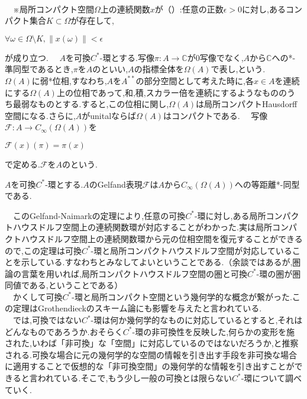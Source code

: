 \\
　※局所コンパクト空間$\Omega$上の連続関数$x$が（）:任意の正数$\epsilon >0$に対し,あるコンパクト集合$K\subset \Omega$が存在して,
\begin{center}
$\forall \omega \in \Omega\setminus K,\parallel x\left( \omega\right)\parallel<\epsilon$
\end{center}
が成り立つ.
　$A$を可換$C^*$-環とする.写像$\pi:A\rightarrow\mathbb{C}$が0写像でなく,$A$から$\mathbb{C}$への*-準同型であるとき,$\pi$を$A$のといい,$A$の指標全体を$\Omega\left(A\right)$で表し,という.
　$\Omega\left(A\right)$に弱*位相,すなわち,$A$を$A^{**}$の部分空間として考えた時に,各$x\in A$を連続にする$\Omega\left(A\right)$上の位相であって,和,積,スカラー倍を連続にするようなもののうち最弱なものとする.すると,この位相に関し,$\Omega\left(A\right)$は局所コンパクトHausdorff空間になる.さらに,$A$がunitalならば$\Omega\left(A\right)$はコンパクトである.
　写像$\mathscr{F}:A \rightarrow C_{\infty}\left(\Omega\left(A\right)\right)$を
\begin{center}
$\mathscr{F}\left(x\right)\left(\pi\right)=\pi\left(x\right)$
\end{center}
で定める.$\mathscr{F}$を$A$のという.
\begin{theo}
$A$を可換$C^*$-環とする.$A$の{\rm Gelfand}表現$\mathscr{F}$は$A$から$C_{\infty}\left(\Omega\left(A\right)\right)$への等距離*-同型である.
\end{theo}
　このGelfand-Naimarkの定理により,任意の可換$C^*$-環に対し,ある局所コンパクトハウスドルフ空間上の連続関数環が対応することがわかった.実は局所コンパクトハウスドルフ空間上の連続関数環から元の位相空間を復元することができるので,この定理は可換$C^*$-環と局所コンパクトハウスドルフ空間が対応していることを示している.すなわちとみなしてよいということである.（余談ではあるが,圏論の言葉を用いれば,局所コンパクトハウスドルフ空間の圏と可換$C^*$-環の圏が圏同値である,ということである）\\
　かくして可換$C^*$-環と局所コンパクト空間という幾何学的な概念が繋がった.この定理はGrothendieckのスキーム論にも影響を与えたと言われている.\\
　では,可換ではない$C^*$-環は何か幾何学的なものに対応しているとすると,それはどんなものであろうか.おそらく$C^*$-環の非可換性を反映した,何らかの変形を施された,いわば「非可換」な「空間」に対応しているのではないだろうか,と推察される.可換な場合に元の幾何学的な空間の情報を引き出す手段を非可換な場合に適用することで仮想的な「非可換空間」の幾何学的な情報を引き出すことができると言われている.そこで,もう少し一般の可換とは限らない$C^*$-環について調べていく.
